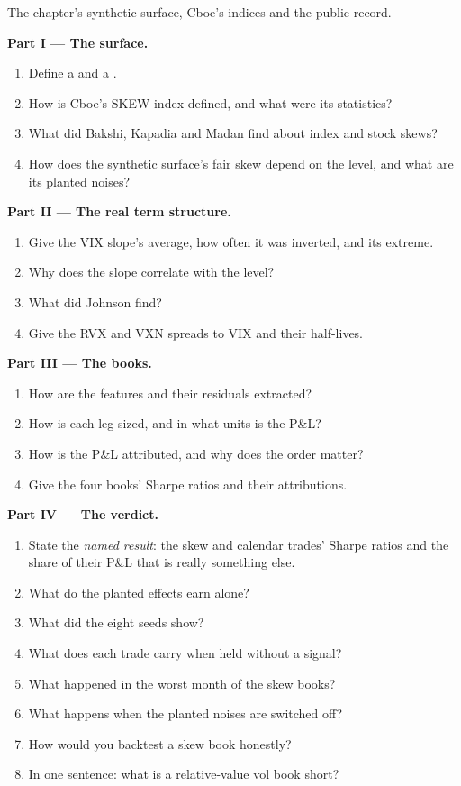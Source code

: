 \begin{problem}\label{pb:s2:skew-and-term-structure-relative-value:1}
The chapter's synthetic surface, Cboe's indices and the public record.

\medskip\noindent\textbf{Part I --- The surface.}
\begin{enumerate}
\item Define a  and a .
\item How is Cboe's SKEW index defined, and what were its statistics?
\item What did Bakshi, Kapadia and Madan find about index and stock skews?
\item How does the synthetic surface's fair skew depend on the level, and what are its planted noises?
\end{enumerate}

\medskip\noindent\textbf{Part II --- The real term structure.}
\begin{enumerate}[resume]
\item Give the VIX slope's average, how often it was inverted, and its extreme.
\item Why does the slope correlate with the level?
\item What did Johnson find?
\item Give the RVX and VXN spreads to VIX and their half-lives.
\end{enumerate}

\medskip\noindent\textbf{Part III --- The books.}
\begin{enumerate}[resume]
\item How are the features and their residuals extracted?
\item How is each leg sized, and in what units is the P\&L?
\item How is the P\&L attributed, and why does the order matter?
\item Give the four books' Sharpe ratios and their attributions.
\end{enumerate}

\medskip\noindent\textbf{Part IV --- The verdict.}
\begin{enumerate}[resume]
\item State the \emph{named result}: the skew and calendar trades' Sharpe ratios and the share of their P\&L that is really something else.
\item What do the planted effects earn alone?
\item What did the eight seeds show?
\item What does each trade carry when held without a signal?
\item What happened in the worst month of the skew books?
\item What happens when the planted noises are switched off?
\item How would you backtest a skew book honestly?
\item In one sentence: what is a relative-value vol book short?
\end{enumerate}
\end{problem}

